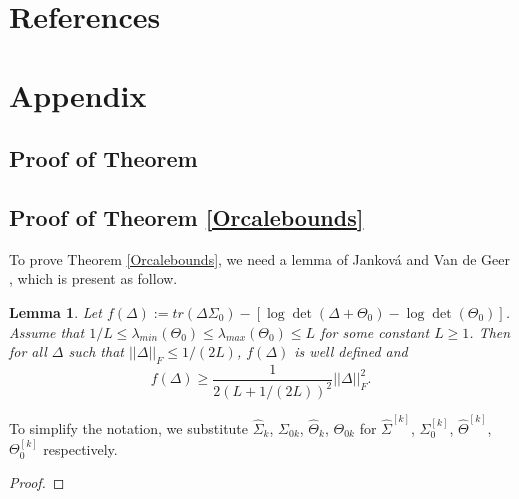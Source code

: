 \documentclass[review]{elsarticle}
\newcommand{\1}{{\bf 1}}
\newcommand{\0}{{\bf 0}}
\newtheorem{proof}{Proof}
\newtheorem{lem}[thm]{Lemma}
\begin{document}
\section*{References}

%



\section*{Appendix}

\begin{appendices}

	
\section{Proof of Theorem}
	

\subsection{Proof of Theorem \ref{Orcalebounds}}
 To prove Theorem \ref{Orcalebounds}, we need a lemma of Jankov{\'a} and Van de Geer \cite{jankova2018inference}, which is present as follow.

\begin{lem}\label{lembasic}
Let $f(\Delta):=tr(\Delta\Sigma_{0})-[\log\det(\Delta+\Theta_{0})-\log\det(\Theta_{0})]$. Assume that $1/L\leq \lambda_{min}(\Theta_0)\leq \lambda_{max}(\Theta_0)\leq L$ for some constant $L\geq 1$. Then for all $\Delta$ such that $||\Delta||_{F} \leq 1/(2L)$, $f(\Delta)$ is well defined and
\begin{equation}
f(\Delta) \geq \frac{1}{2(L+1/(2L))^2}||\Delta||_{F}^2.
\end{equation}
\end{lem}


 To simplify the notation, we substitute $\widehat{\Sigma}_k$, $\Sigma_{0k}$, $\widehat{\Theta}_k$, $\Theta_{0k}$ for $\widehat{\Sigma}^{[k]}$, $\Sigma_{0}^{[k]}$, $\widehat{\Theta}^{[k]}$, $\Theta_{0}^{[k]}$ respectively.


\begin{proof}


\end{proof}
\end{appendices}
\end{document}
